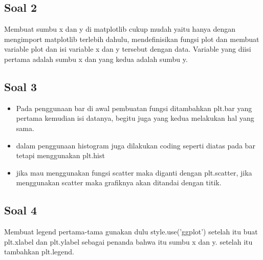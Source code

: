 \subsection{Soal 2}
Membuat sumbu x dan y di matplotlib cukup mudah yaitu hanya dengan mengimport matplotlib terlebih dahulu, mendefinisikan fungsi plot dan membuat variable plot dan isi variable x dan y tersebut dengan data. Variable yang diisi pertama adalah sumbu x dan yang kedua adalah sumbu y.


\subsection{Soal 3}
\begin{itemize}
\item Pada penggunaan bar di awal pembuatan fungsi ditambahkan plt.bar  yang pertama kemudian isi datanya, begitu juga yang kedua melakukan hal yang sama.

\item dalam penggunaan histogram juga dilakukan coding seperti diatas pada bar tetapi menggunakan plt.hist
\item jika mau menggunakan fungsi scatter maka diganti dengan plt.scatter, jika menggunakan scatter maka grafiknya akan ditandai dengan titik.

\end{itemize}
\subsection{Soal 4}
Membuat legend pertama-tama gunakan dulu style.use('ggplot') setelah itu buat plt.xlabel dan plt.ylabel sebagai penanda bahwa itu sumbu x dan y. setelah itu tambahkan plt.legend.

